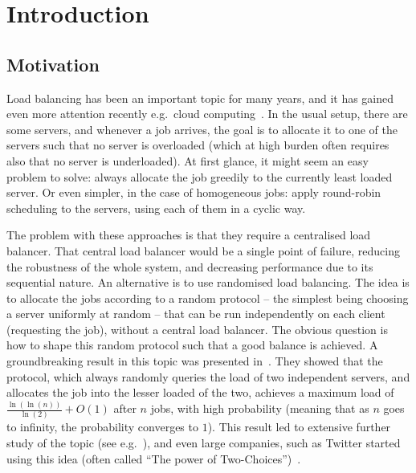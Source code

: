 \chapter{Introduction}\label{introduction}

\ifpdf
    \graphicspath{{Chapter1/Figs/Raster/}{Chapter1/Figs/PDF/}{Chapter1/Figs/}}
\else
    \graphicspath{{Chapter1/Figs/Vector/}{Chapter1/Figs/}}
\fi


\section{Motivation}

Load balancing has been an important topic for many years, and it has gained even more attention recently e.g.\ cloud computing~\cite{mishra2020cloud}. In the usual setup, there are some servers, and whenever a job arrives, the goal is to allocate it to one of the servers such that no server is overloaded (which at high burden often requires also that no server is underloaded). At first glance, it might seem an easy problem to solve: always allocate the job greedily to the currently least loaded server. Or even simpler, in the case of homogeneous jobs: apply round-robin scheduling to the servers, using each of them in a cyclic way. 

The problem with these approaches is that they require a centralised load balancer. That central load balancer would be a single point of failure, reducing the robustness of the whole system, and decreasing performance due to its sequential nature. An alternative is to use randomised load balancing. The idea is to allocate the jobs according to a random protocol -- the simplest being choosing a server uniformly at random -- that can be run independently on each client (requesting the job), without a central load balancer. The obvious question is how to shape this random protocol such that a good balance is achieved. A groundbreaking result in this topic was presented in~\cite{azar1999twochoice}. They showed that the \TwoChoice protocol, which always randomly queries the load of two independent servers, and allocates the job into the lesser loaded of the two, achieves a maximum load of $\frac{\ln(\ln(n))}{\ln(2)} + O(1)$ after $n$ jobs, with high probability (meaning that as $n$ goes to infinity, the probability converges to $1$). This result led to extensive further study of the topic (see e.g.~\cite{richa2001surveytwochoice}), and even large companies, such as Twitter started using this idea (often called ``The power of Two-Choices'')~\cite{anderson2019twitter}.


